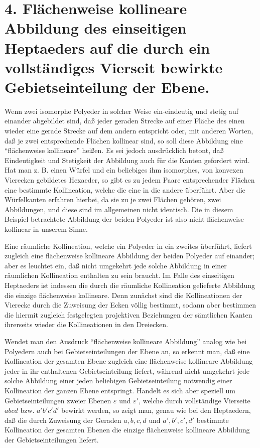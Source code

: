 \documentclass[11pt,a4paper]{article}
\begin{document}
\section*{4. Fl\"achenweise kollineare Abbildung des einseitigen Heptaeders auf die durch ein vollst\"andiges Vierseit bewirkte Gebietseinteilung der Ebene.}

Wenn zwei isomorphe Polyeder in solcher Weise ein-eindeutig und stetig auf einander abgebildet sind, da\ss{} jeder geraden Strecke auf einer Fl\"ache des einen wieder eine gerade Strecke auf dem andern entspricht oder, mit anderen Worten, da\ss{} je zwei entsprechende Fl\"achen kollinear sind, so soll diese Abbildung eine ``fl\"achenweise kollineare'' hei\ss{}en. Es sei jedoch ausdr\"ucklich betont, da\ss{} Eindeutigkeit und Stetigkeit der Abbildung auch f\"ur die Kanten gefordert wird. Hat man z. B. einen W\"urfel und ein beliebiges ihm isomorphes, von konvexen Vierecken gebildetes Hexaeder, so gibt es zu jedem Paare entsprechender Fl\"achen eine bestimmte Kollineation, welche die eine in die andere \"uberf\"uhrt. Aber die W\"urfelkanten erfahren hierbei, da sie zu je zwei Fl\"achen geh\"oren, zwei Abbildungen, und diese sind im allgemeinen nicht identisch. Die in diesem Beispiel betrachtete Abbildung der beiden Polyeder ist also nicht fl\"achenweise kollinear in unserem Sinne.

Eine r\"aumliche Kollineation, welche ein Polyeder in ein zweites \"uberf\"uhrt, liefert zugleich eine fl\"achenweise kollineare Abbildung der beiden Polyeder auf einander; aber es leuchtet ein, da\ss{} nicht umgekehrt jede solche Abbildung in einer r\"aumlichen Kollineation enthalten zu sein braucht. Im Falle des einseitigen Heptaeders ist indessen die durch die r\"aumliche Kollineation gelieferte Abbildung die einzige fl\"achenweise kollineare. Denn zun\"achst sind die Kollineationen der Vierecke durch die Zuweisung der Ecken v\"ollig bestimmt, sodann aber bestimmen die hiermit zugleich festgelegten projektiven Beziehungen der s\"amtlichen Kanten ihrerseits wieder die Kollineationen in den Dreiecken.

Wendet man den Ausdruck ``fl\"achenweise kollineare Abbildung'' analog wie bei Polyedern auch bei Gebietseinteilungen der Ebene an, so erkennt man, da\ss{} eine Kollineation der gesamten Ebene zugleich eine fl\"achenweise kollineare Abbildung jeder in ihr enthaltenen Gebietseinteilung liefert, w\"ahrend nicht umgekehrt jede solche Abbildung einer jeden beliebigen Gebietseinteilung notwendig einer Kollineation der ganzen Ebene entspringt. Handelt es sich aber speziell um Gebietseinteilungen zweier Ebenen $\varepsilon$ und $\varepsilon'$, welche durch vollst\"andige Vierseite $abcd$ bzw. $a'b'c'd'$ bewirkt werden, so zeigt man, genau wie bei den Heptaedern, da\ss{} die durch Zuweisung der Geraden $a,b,c,d$ und $a',b',c',d'$ bestimmte Kollineation der gesamten Ebenen die einzige fl\"achenweise kollineare Abbildung der Gebietseinteilungen liefert.
\end{document}
